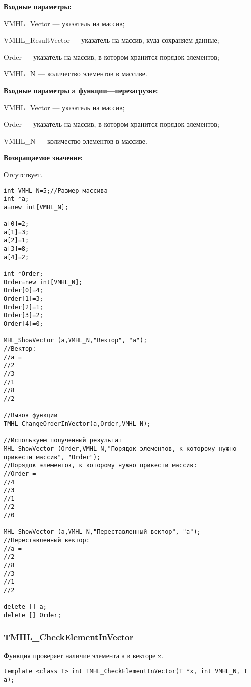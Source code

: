 \documentclass[a4paper,12pt]{article}
\begin{document}
\textbf{Входные параметры:}
 
VMHL\_Vector --- указатель на массив;
 
VMHL\_ResultVector --- указатель на массив, куда сохраняем данные;
 
Order --- указатель на массив, в котором хранится порядок элементов;
 
VMHL\_N --- количество элементов в массиве.
 
\textbf{Входные параметры a функции---перезагрузке:}
 
VMHL\_Vector --- указатель на массив;
 
Order --- указатель на массив, в котором хранится порядок элементов;
 
VMHL\_N --- количество элементов в массиве.

\textbf{Возвращаемое значение:}

Отсутствует.


\begin{lstlisting}[label=code_use_TMHL_ChangeOrderInVector,caption=Пример использования]
int VMHL_N=5;//Размер массива
int *a;
a=new int[VMHL_N];

a[0]=2;
a[1]=3;
a[2]=1;
a[3]=8;
a[4]=2;

int *Order;
Order=new int[VMHL_N];
Order[0]=4;
Order[1]=3;
Order[2]=1;
Order[3]=2;
Order[4]=0;

MHL_ShowVector (a,VMHL_N,"Вектор", "a");
//Вектор:
//a =	
//2
//3
//1
//8
//2

//Вызов функции
TMHL_ChangeOrderInVector(a,Order,VMHL_N);

//Используем полученный результат
MHL_ShowVector (Order,VMHL_N,"Порядок элементов, к которому нужно привести массив", "Order");
//Порядок элементов, к которому нужно привести массив:
//Order =	
//4
//3
//1
//2
//0          

MHL_ShowVector (a,VMHL_N,"Переставленный вектор", "a");
//Переставленный вектор:
//a =	
//2
//8
//3
//1
//2          

delete [] a;
delete [] Order;
\end{lstlisting}

\subsubsection{TMHL\_CheckElementInVector}\label{TMHL_CheckElementInVector}

Функция проверяет наличие элемента а в векторе x.


\begin{lstlisting}[label=code_syntax_TMHL_CheckElementInVector,caption=Синтаксис]
template <class T> int TMHL_CheckElementInVector(T *x, int VMHL_N, T a);
\end{lstlisting}
\end{document}
